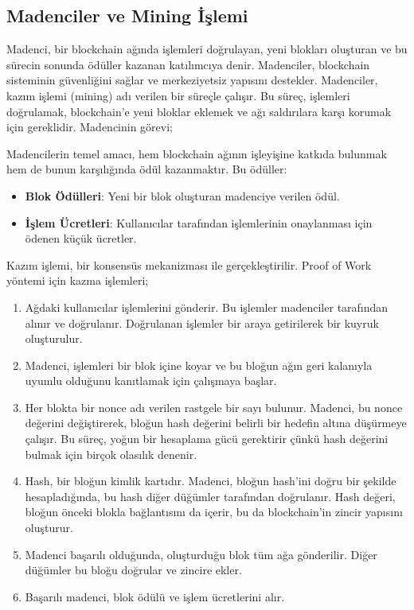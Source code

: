 \subsection{Madenciler ve Mining İşlemi}

Madenci, bir blockchain ağında işlemleri doğrulayan, yeni blokları oluşturan ve bu sürecin sonunda ödüller kazanan katılımcıya denir. Madenciler, blockchain sisteminin güvenliğini sağlar ve merkeziyetsiz yapısını destekler. Madenciler, kazım işlemi (mining) adı verilen bir süreçle çalışır. Bu süreç, işlemleri doğrulamak, blockchain'e yeni bloklar eklemek ve ağı saldırılara karşı korumak için gereklidir. Madencinin görevi;

Madencilerin temel amacı, hem blockchain ağının işleyişine katkıda bulunmak hem de bunun karşılığında ödül kazanmaktır. Bu ödüller:

\begin{itemize}
    \item \textbf{Blok Ödülleri}: Yeni bir blok oluşturan madenciye verilen ödül.
    \item \textbf{İşlem Ücretleri}: Kullanıcılar tarafından işlemlerinin onaylanması için ödenen küçük ücretler.
\end{itemize}

Kazım işlemi, bir konsensüs mekanizması ile gerçekleştirilir. Proof of Work yöntemi için kazma işlemleri;

\begin{enumerate}
    \item Ağdaki kullanıcılar işlemlerini gönderir. Bu işlemler madenciler tarafından alınır ve doğrulanır. Doğrulanan işlemler bir araya getirilerek bir kuyruk oluşturulur.
    \item Madenci, işlemleri bir blok içine koyar ve bu bloğun ağın geri kalanıyla uyumlu olduğunu kanıtlamak için çalışmaya başlar.
    \item Her blokta bir nonce adı verilen rastgele bir sayı bulunur. Madenci, bu nonce değerini değiştirerek, bloğun hash değerini belirli bir hedefin altına düşürmeye çalışır. Bu süreç, yoğun bir hesaplama gücü gerektirir çünkü hash değerini bulmak için birçok olasılık denenir.
    \item Hash, bir bloğun kimlik kartıdır. Madenci, bloğun hash'ini doğru bir şekilde hesapladığında, bu hash diğer düğümler tarafından doğrulanır. Hash değeri, bloğun önceki blokla bağlantısını da içerir, bu da blockchain'in zincir yapısını oluşturur.
    \item Madenci başarılı olduğunda, oluşturduğu blok tüm ağa gönderilir. Diğer düğümler bu bloğu doğrular ve zincire ekler.
    \item Başarılı madenci, blok ödülü ve işlem ücretlerini alır.
\end{enumerate}


